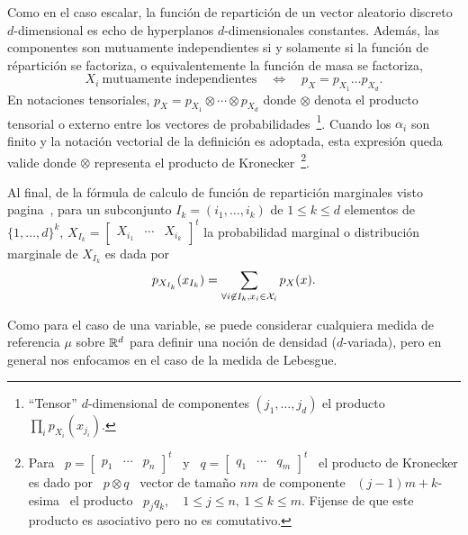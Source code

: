 Como en  el caso escalar, la  funci\'on de repartici\'on de  un vector aleatorio
discreto $d$-dimensional es echo de hyperplanos $d$-dimensionales constantes.
Adem\'as, las  componentes son mutuamente  independientes si y solamente  si la
funci\'on de  r\'epartici\'on se factoriza,  o equivalentemente la  funci\'on de
masa se factoriza, \ie
%
\[
X_i  \:  \mbox{mutuamente independientes}  \quad  \Leftrightarrow  \quad p_X  =
p_{X_1} \ldots  p_{X_d}.
\]
%
En notaciones tensoriales, $p_X =  p_{X_1} \otimes \cdots \otimes p_{X_d}$ donde
$\otimes$  denota  el  producto  tensorial  o  externo  entre  los  vectores  de
probabilidades~\footnote{``Tensor''      $d$-dimensional      de     componentes
  $(j_1,\ldots,j_d)$  el  producto $\prod_i  p_{X_i}  (x_{j_i})$.}.  Cuando  los
$\alpha_i$ son finito y la  notaci\'on vectorial de la definici\'on es adoptada,
esta  expresi\'on  queda  valide  donde  $\otimes$  representa  el  producto  de
Kronecker~\footnote{Para   \    $p   =   \begin{bmatrix}   p_1    &   \cdots   &
    p_n  \end{bmatrix}^t$   \  y  \  $q   =  \begin{bmatrix}  q_1   &  \cdots  &
    q_m \end{bmatrix}^t$ \ el producto de  Kronecker es dado por \ $p \otimes q$
  \ vector de tama\~no $n m$ de componente \ $(j-1) m + k$-esima \ el producto \
  $p_j  q_k, \quad 1  \le j  \le n,  \: 1  \le k  \le m$.   Fijense de  que este
  producto es asociativo pero no es comutativo.\label{Foot:MP:Kronecker}}.

Al  final, de la  f\'ormula de  calculo de  funci\'on de  repartici\'on marginales
visto  pagina~\pageref{Pagina:MP:MarginalesF},   para  un  subconjunto   $I_k  =
(i_1,\ldots,i_k)$ de  $1 \le k  \le d$ elementos  de $\{ 1  , \ldots ,  d \}^k$,
$X_{I_k}  =  \begin{bmatrix}  X_{i_1}  &  \cdots  &  X_{i_k}\end{bmatrix}^t$  la
probabilidad marginal o distribuci\'on marginale de $X_{I_k}$ es dada por
%
\[
p_{X_{I_k}}(x_{I_k}) = \sum_{\forall i \not\in I_k, x_i \in \mathcal{X}_i} p_X(x).
\]




\label{Ssec:MP:VecContinuo}

Como para  el caso  de una  variable, se puede  considerar cualquiera  medida de
referencia  $\mu$  sobre  $\mathbb{R}^d$   para  definir  una  noci\'on  de  densidad
($d$-variada),  pero  en general  nos  enfocamos  en el  caso  de  la medida  de
Lebesgue.

